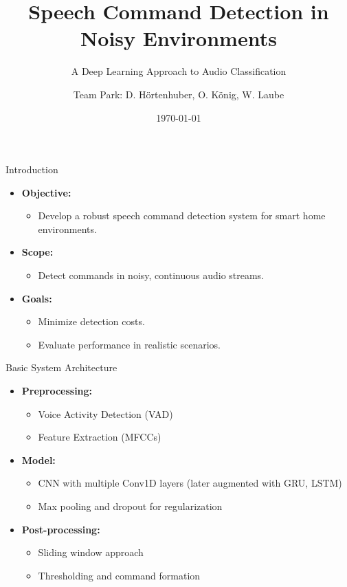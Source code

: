 \documentclass{beamer}
\title{Speech Command Detection in Noisy Environments}
\subtitle{A Deep Learning Approach to Audio Classification}
\author{Team Park: D. Hörtenhuber, O. König, W. Laube}
\institute{JKU \\ MLPC}
\date{\today}
\begin{document}
\begin{frame}
  \titlepage
\end{frame}

\begin{frame}{Introduction}
  \begin{itemize}
    \item \textbf{Objective:}
          \begin{itemize}
          \item Develop a robust speech command detection system for smart home environments.
            \end{itemize}
    \item \textbf{Scope:} 
          \begin{itemize}
    \item Detect commands in noisy, continuous audio streams.
          \end{itemize}
    \item \textbf{Goals:}
      \begin{itemize}
        \item Minimize detection costs.
        \item Evaluate performance in realistic scenarios.
      \end{itemize}
  \end{itemize}
\end{frame}

\begin{frame}{Basic System Architecture}
  \begin{itemize}
    \item \textbf{Preprocessing:}
      \begin{itemize}
        \item Voice Activity Detection (VAD)
        \item Feature Extraction (MFCCs)
      \end{itemize}
    \item \textbf{Model:}
      \begin{itemize}
        \item CNN with multiple Conv1D layers (later augmented with GRU, LSTM)
        \item Max pooling and dropout for regularization
      \end{itemize}
    \item \textbf{Post-processing:}
      \begin{itemize}
        \item Sliding window approach
        \item Thresholding and command formation
      \end{itemize}
  \end{itemize}
\end{frame}
\end{document}

